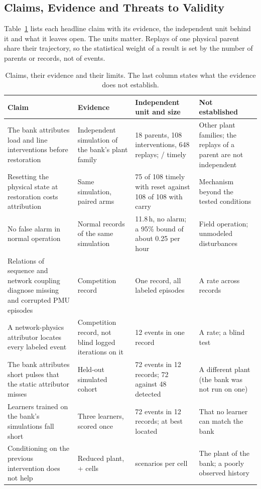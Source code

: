 \subsection{Claims, Evidence and Threats to Validity}
\label{sec:validity}
Table~\ref{tab:claims} lists each headline claim with its evidence, the independent unit behind it and what it leaves open. The units matter. Replays of one physical parent share their trajectory, so the statistical weight of a result is set by the number of parents or records, not of events.

\begin{table}[t]\centering\footnotesize
\caption{Claims, their evidence and their limits. The last column states what the evidence does not establish.}
\label{tab:claims}
\begin{tabularx}{\textwidth}{p{}p{}p{}X}\toprule
Claim & Evidence & Independent unit and size & Not established \\\midrule
The bank attributes load and line interventions before restoration & Independent simulation of the bank's plant family & 18 parents, 108 interventions, 648 replays; \COneMixTimely{}/\COneMixTotal{} timely & Other plant families; the replays of a parent are not independent \\
Resetting the physical state at restoration costs attribution & Same simulation, paired arms & 75 of 108 timely with reset against 108 of 108 with carry & Mechanism beyond the tested conditions \\
No false alarm in normal operation & Normal records of the same simulation & 11.8\,h, no alarm; a 95\% bound of about 0.25 per hour & Field operation; unmodeled disturbances \\
Relations of sequence and network coupling diagnose missing and corrupted PMU episodes & Competition record & One record, all labeled episodes & A rate across records \\
A network-physics attributor locates every labeled event & Competition record, not blind \AERawIterOne{} logged iterations on it & 12 events in one record & A rate; a blind test \\
The bank attributes short pulses that the static attributor misses & Held-out simulated cohort & 72 events in 12 records; 72 against 48 detected & A different plant (the bank was not run on one) \\
Learners trained on the bank's simulations fall short & Three learners, scored once & 72 events in 12 records; at best \FBBestTop{} located & That no learner can match the bank \\
Conditioning on the previous intervention does not help & Reduced plant, \HHCells{}+\HHExtCells{} cells & \HHScenarios{} scenarios per cell & The plant of the bank; a poorly observed history \\\bottomrule
\end{tabularx}
\end{table}

